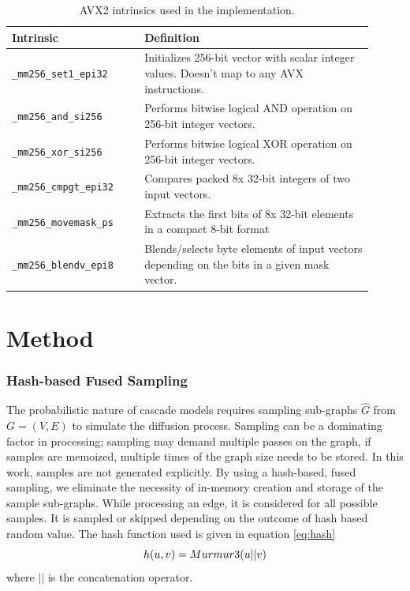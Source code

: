 \documentclass[10pt,journal,compsoc]{IEEEtran}
\begin{document}
\begin{table}[!ht]
    \caption{AVX2 intrinsics used in the implementation.}
    \label{tab:avx2-instructions}
    \centering

    \begin{tabular}{|p{0.33\linewidth}|p{0.58\linewidth}|}
    \hline
    Intrinsic & Definition\\
    \hline
    {\tt \_mm256\_set1\_epi32} & Initializes 256-bit vector with scalar integer values. Doesn't map to any AVX instructions. \\
    {\tt \_mm256\_and\_si256} & Performs bitwise logical AND operation on 256-bit integer vectors. \\
    {\tt \_mm256\_xor\_si256} &  Performs bitwise logical XOR operation on 256-bit integer vectors.\\
    {\tt \_mm256\_cmpgt\_epi32} & Compares packed 8x 32-bit integers of two input vectors. \\
    {\tt \_mm256\_movemask\_ps} & Extracts the first bits of 8x 32-bit elements in a compact 8-bit format \\
    {\tt \_mm256\_blendv\_epi8} & Blends/selects byte elements of input vectors depending on the bits in a given mask vector.\\ 
             \hline         
    \end{tabular}
\end{table}{}

\section{Method}\label{sec:method}

\subsubsection{Hash-based Fused Sampling}
The probabilistic nature of cascade models requires sampling sub-graphs $\hat{G}$ from $G = (V, E)$ to simulate the diffusion process.  Sampling can be a dominating factor in processing; sampling may demand multiple passes on the graph, if samples are memoized, multiple times of the graph size needs to be stored.
In this work, samples are not generated explicitly. By using a hash-based, fused sampling, we eliminate the necessity of in-memory creation and storage of the sample sub-graphs.
While processing an edge, it is considered for all possible samples.
It is sampled or skipped depending on the outcome of hash based random value. The hash function used is given in equation \ref{eq:hash}
\begin{equation}
    \label{eq:hash}
    h(u,v) = \mbox{{\sc Murmur3}}(u||v)  
\end{equation}
where $||$ is the concatenation operator. 
\end{document}
